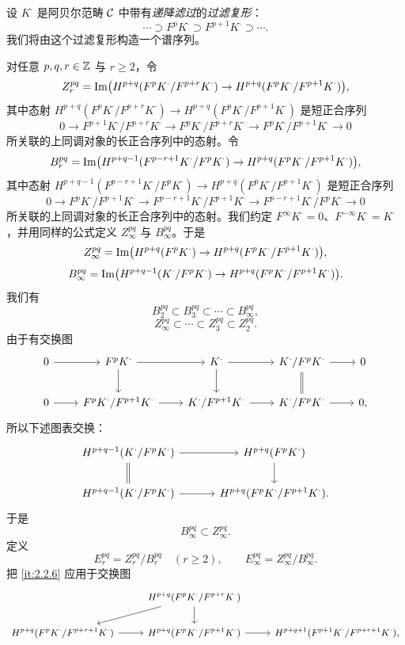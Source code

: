 设 $K^{\cdot}$ 是阿贝尔范畴 $\mathcal{C}$ 中带有\emph{递降滤过}的\emph{过滤复形}：
\[
\cdots\supset F^pK^{\cdot}\supset F^{p+1}K^{\cdot}\supset\cdots.
\]
我们将由这个过滤复形构造一个谱序列。

对任意 $p,q,r\in\mathbb{Z}$ 与 $r\ge 2$，令
\[
Z_r^{pq}=\operatorname{Im}\bigl(H^{p+q}(F^pK^{\cdot}/F^{p+r}K^{\cdot})\to H^{p+q}(F^pK^{\cdot}/F^{p+1}K^{\cdot})\bigr),
\]
其中态射 $H^{p+q}(F^pK^{\cdot}/F^{p+r}K^{\cdot})\to H^{p+q}(F^pK^{\cdot}/F^{p+1}K^{\cdot})$ 是短正合序列
\[
0\to F^{p+1}K^{\cdot}/F^{p+r}K^{\cdot}\to F^pK^{\cdot}/F^{p+r}K^{\cdot}\to F^pK^{\cdot}/F^{p+1}K^{\cdot}\to 0
\]
所关联的上同调对象的长正合序列中的态射。令
\[
B_r^{pq}=\operatorname{Im}\bigl(H^{p+q-1}(F^{p-r+1}K^{\cdot}/F^pK^{\cdot})\to H^{p+q}(F^pK^{\cdot}/F^{p+1}K^{\cdot})\bigr),
\]
其中态射 $H^{p+q-1}(F^{p-r+1}K^{\cdot}/F^pK^{\cdot})\to H^{p+q}(F^pK^{\cdot}/F^{p+1}K^{\cdot})$ 是短正合序列
\[
0\to F^pK^{\cdot}/F^{p+1}K^{\cdot}\to F^{p-r+1}K^{\cdot}/F^{p+1}K^{\cdot}\to F^{p-r+1}K^{\cdot}/F^pK^{\cdot}\to 0
\]
所关联的上同调对象的长正合序列中的态射。我们约定 $F^\infty K^{\cdot}=0$、$F^{-\infty}K^{\cdot}=K^{\cdot}$，并用同样的公式定义 $Z_\infty^{pq}$ 与 $B_\infty^{pq}$。于是
\[
Z_\infty^{pq}=\operatorname{Im}\bigl(H^{p+q}(F^pK^{\cdot})\to H^{p+q}(F^pK^{\cdot}/F^{p+1}K^{\cdot})\bigr),
\]
\[
B_\infty^{pq}=\operatorname{Im}\bigl(H^{p+q-1}(K^{\cdot}/F^pK^{\cdot})\to H^{p+q}(F^pK^{\cdot}/F^{p+1}K^{\cdot})\bigr).
\]
我们有
\[
B_2^{pq}\subset B_3^{pq}\subset\cdots\subset B_\infty^{pq},
\]
\[
Z_\infty^{pq}\subset\cdots\subset Z_3^{pq}\subset Z_2^{pq}.
\]
由于有交换图
\[\begin{tikzcd}[column sep=2.2em,row sep=1.9em]
0 \arrow[r] & F^pK^{\cdot} \arrow[r] \arrow[d] & K^{\cdot} \arrow[r] \arrow[d] & K^{\cdot}/F^pK^{\cdot} \arrow[r] \arrow[d,equal] & 0\\
0 \arrow[r] & F^pK^{\cdot}/F^{p+1}K^{\cdot} \arrow[r] & K^{\cdot}/F^{p+1}K^{\cdot} \arrow[r] & K^{\cdot}/F^pK^{\cdot} \arrow[r] & 0,
\end{tikzcd}\]
所以下述图表交换：
\[\begin{tikzcd}[column sep=3.2em,row sep=1.9em]
H^{p+q-1}(K^{\cdot}/F^pK^{\cdot}) \arrow[r] \arrow[d,equal] & H^{p+q}(F^pK^{\cdot}) \arrow[d] \\
H^{p+q-1}(K^{\cdot}/F^pK^{\cdot}) \arrow[r] & H^{p+q}(F^pK^{\cdot}/F^{p+1}K^{\cdot}).
\end{tikzcd}\]
于是
\[
B_\infty^{pq}\subset Z_\infty^{pq}.
\]
定义
\[
E_r^{pq}=Z_r^{pq}/B_r^{pq}\quad(r\ge 2),\qquad E_\infty^{pq}=Z_\infty^{pq}/B_\infty^{pq}.
\]
把 \ref{it:2.2.6} 应用于交换图
\[\begin{tikzcd}[column sep=2.4em,row sep=1.7em,cells={nodes={font=\small}}]
& H^{p+q}(F^pK^{\cdot}/F^{p+r}K^{\cdot}) \arrow[dl] \arrow[d] & \\
H^{p+q}(F^pK^{\cdot}/F^{p+r+1}K^{\cdot}) \arrow[r] & H^{p+q}(F^pK^{\cdot}/F^{p+1}K^{\cdot}) \arrow[r] & H^{p+q+1}(F^{p+1}K^{\cdot}/F^{p+r+1}K^{\cdot}),
\end{tikzcd}\]
